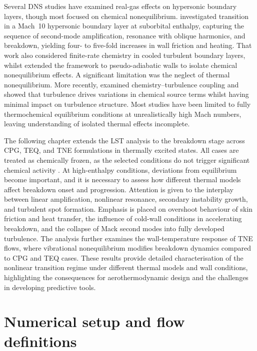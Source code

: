 Several \gls{DNS} studies have examined real-gas effects on hypersonic boundary layers, though most focused on chemical nonequilibrium. \citet{DiRenzo2021} investigated transition in a Mach~10 hypersonic boundary layer at suborbital enthalpy, capturing the sequence of second-mode amplification, resonance with oblique harmonics, and breakdown, yielding four- to five-fold increases in wall friction and heating. That work also considered finite-rate chemistry in cooled turbulent boundary layers, whilst \citet{Passiatoreetal2021} extended the framework to pseudo-adiabatic walls to isolate chemical nonequilibrium effects. A significant limitation was the neglect of thermal nonequilibrium. More recently, \citet{Williamsetal2025} examined chemistry--turbulence coupling and showed that turbulence drives variations in chemical source terms whilst having minimal impact on turbulence structure. Most studies have been limited to fully thermochemical equilibrium conditions at unrealistically high Mach numbers, leaving understanding of isolated thermal effects incomplete.

The following chapter extends the \gls{LST} analysis to the breakdown stage across \gls{CPG}, \gls{TEQ}, and \gls{TNE} formulations in thermally excited states. All cases are treated as chemically frozen, as the selected conditions do not trigger significant chemical activity \citep{BitterShepherd2015}. At high-enthalpy conditions, deviations from equilibrium become important, and it is necessary to assess how different thermal models affect breakdown onset and progression. Attention is given to the interplay between linear amplification, nonlinear resonance, secondary instability growth, and turbulent spot formation. Emphasis is placed on overshoot behaviour of skin friction and heat transfer, the influence of cold-wall conditions in accelerating breakdown, and the collapse of Mack second modes into fully developed turbulence. The analysis further examines the wall-temperature response of \gls{TNE} flows, where vibrational nonequilibrium modifies breakdown dynamics compared to \gls{CPG} and \gls{TEQ} cases. These results provide detailed characterisation of the nonlinear transition regime under different thermal models and wall conditions, highlighting the consequences for aerothermodynamic design and the challenges in developing predictive tools.

\section{Numerical setup and flow definitions}

